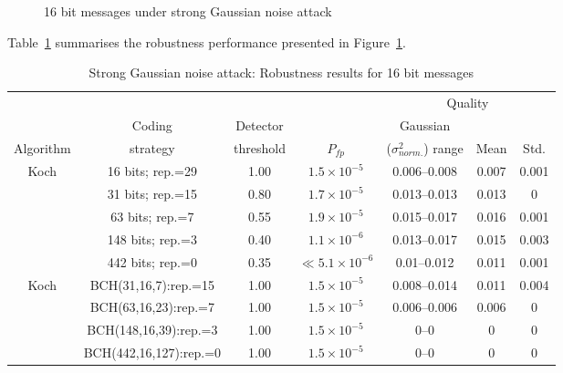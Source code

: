 \documentclass[12pt]{report}
\begin{document}
\begin{figure}[p]
        \caption{16 bit messages under strong Gaussian noise attack}
        \label{fig:sgn16babPentBK}
\setlength{\abovecaptionskip}{0cm}
\end{figure}
Table~\ref{tab:GNResStrongBK} summarises the robustness performance presented in Figure~\ref{fig:sgn16babPentBK}.
\begin{table}[htb]
\tiny
        \begin{center}
                \begin{tabular}{|c|c|c|c|c|c|c|} \hline
			  &		&	&		& \multicolumn{3}{c|}{Quality}	\\ \cline{5-7}
			  & Coding   & Detector	 & 	    & Gaussian 			  & 	 & \\
                Algorithm & strategy & threshold & $P_{fp}$ & ($\sigma_{norm.}^{2}$) range & Mean &Std. \\\hline\hline
                Koch & 16 bits; rep.=29	     & 1.00     			& $1.5\times 10^{-5}$   &0.006--0.008      &0.007     &0.001     \\ \cline{2-7}
                	& 31 bits; rep.=15      & 0.80     			& $1.7\times 10^{-5}$   &0.013--0.013       &0.013     &0     \\ \cline{2-7}
                	& 63 bits; rep.=7       & 0.55     			& $1.9\times 10^{-5}$   &0.015--0.017       &0.016     &0.001     \\ \cline{2-7}
                	& 148 bits; rep.=3      & 0.40     			& $1.1\times 10^{-6}$   &0.013--0.017       &0.015     &0.003     \\ \cline{2-7}
                	& 442 bits; rep.=0      & 0.35     			& $\ll5.1\times 10^{-6}$&0.01--0.012        &0.011     &0.001   \\ \hline\hline
		
		Koch & BCH(31,16,7):rep.=15  & 1.00	& $1.5\times 10^{-5}$	& 0.008--0.014		& 0.011		& 0.004	\\ \cline{2-7}
			& BCH(63,16,23):rep.=7  & 1.00	& $1.5\times 10^{-5}$	& 0.006--0.006		& 0.006		& 0 	\\ \cline{2-7}
			& BCH(148,16,39):rep.=3 & 1.00	& $1.5\times 10^{-5}$	& 0--0		& 0 	& 0 	\\ \cline{2-7}
			& BCH(442,16,127):rep.=0& 1.00	& $1.5\times 10^{-5}$	& 0--0 		& 0 	& 0 	\\ \hline
        \end{tabular}
        \caption{Strong Gaussian noise attack: Robustness results for 16 bit messages}
        \label{tab:GNResStrongBK}
        \end{center}
\normalsize
\end{table}
\end{document}
